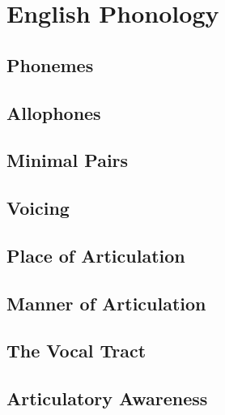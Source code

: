 \chapter{English Phonology}

\section{Phonemes}
\section{Allophones}
\section{Minimal Pairs}
\section{Voicing}
\section{Place of Articulation}
\section{Manner of Articulation}
\section{The Vocal Tract}
\section{Articulatory Awareness}